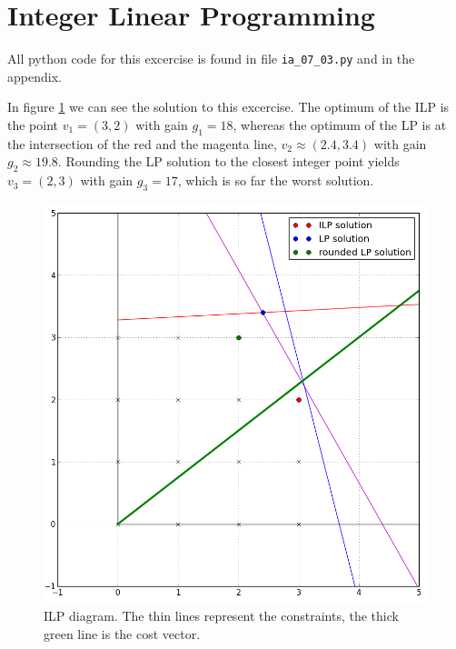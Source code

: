 \documentclass[11pt,a4paper]{scrartcl}
\begin{document}
\section{Integer Linear Programming}
All python code for this excercise is found in file \verb$ia_07_03.py$ and in the appendix. 

In figure \ref{fig:3} we can see the solution to this excercise. The optimum of the ILP is the point $v_1=(3,2)$ with gain $g_1=18$, whereas the optimum of the LP is at the intersection of the red and the magenta line, 
$v_2\approx (2.4,3.4)$ with gain $g_2\approx19.8$. Rounding the LP solution to the closest integer point yields $v_3=(2,3)$ with gain $g_3=17$,  which is so far the worst solution.
\begin{figure}[hb]\label{fig:3}
\includegraphics[width=.5\linewidth]{ex3_cut.png}
\caption{ILP diagram. The thin lines represent the constraints, the thick green line is the cost vector. }
\end{figure}

\clearpage
\appendix

\newpage

\end{document}
